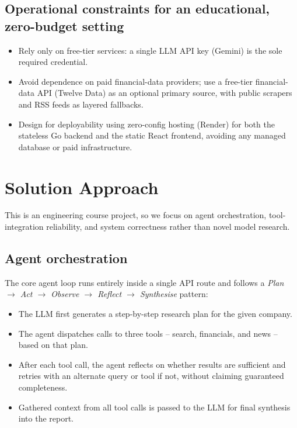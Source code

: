 \documentclass[11pt,a4paper]{article}
\begin{document}
\subsection{Operational constraints for an educational, zero-budget setting}
\begin{itemize}[leftmargin=0.7cm]
    \item Rely only on free-tier services: a single LLM API key (Gemini) is the sole required credential.
    \item Avoid dependence on paid financial-data providers; use a free-tier financial-data API (Twelve Data) as an optional primary source, with public scrapers and RSS feeds as layered fallbacks.
    \item Design for deployability using zero-config hosting (Render) for both the stateless Go backend and the static React frontend, avoiding any managed database or paid infrastructure.
\end{itemize}

\section{Solution Approach}
This is an engineering course project, so we focus on agent orchestration, tool-integration reliability, and system correctness rather than novel model research.

\subsection{Agent orchestration}
The core agent loop runs entirely inside a single API route and follows a \emph{Plan $\rightarrow$ Act $\rightarrow$ Observe $\rightarrow$ Reflect $\rightarrow$ Synthesise} pattern:
\begin{itemize}[leftmargin=0.7cm]
    \item The LLM first generates a step-by-step research plan for the given company.
    \item The agent dispatches calls to three tools -- search, financials, and news -- based on that plan.
    \item After each tool call, the agent reflects on whether results are sufficient and retries with an alternate query or tool if not, without claiming guaranteed completeness.
    \item Gathered context from all tool calls is passed to the LLM for final synthesis into the report.
\end{itemize}
\end{document}
